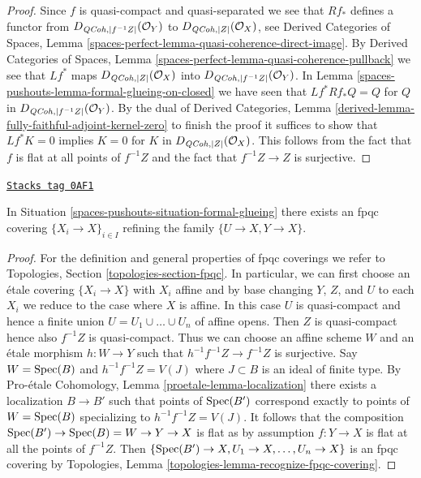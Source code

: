 \begin{proof}
Since $f$ is quasi-compact and quasi-separated we see that $Rf_*$
defines a functor from $D_{\mathit{QCoh}, |f^{-1}Z|}(\mathcal{O}_Y)$
to $D_{\mathit{QCoh}, |Z|}(\mathcal{O}_X)$, see
Derived Categories of Spaces, Lemma
\ref{spaces-perfect-lemma-quasi-coherence-direct-image}.
By Derived Categories of Spaces, Lemma
\ref{spaces-perfect-lemma-quasi-coherence-pullback}
we see that $Lf^*$ maps $D_{\mathit{QCoh}, |Z|}(\mathcal{O}_X)$
into $D_{\mathit{QCoh}, |f^{-1}Z|}(\mathcal{O}_Y)$.
In Lemma \ref{spaces-pushouts-lemma-formal-glueing-on-closed} we have seen that
$Lf^*Rf_*Q = Q$ for $Q$ in $D_{\mathit{QCoh}, |f^{-1}Z|}(\mathcal{O}_Y)$.
By the dual of Derived Categories, Lemma
\ref{derived-lemma-fully-faithful-adjoint-kernel-zero}
to finish the proof it suffices to show that $Lf^*K = 0$
implies $K = 0$ for $K$ in $D_{\mathit{QCoh}, |Z|}(\mathcal{O}_X)$.
This follows from the fact that $f$ is flat at all points of
$f^{-1}Z$ and the fact that $f^{-1}Z \to Z$ is surjective.
\end{proof}

\begin{lemma}
\label{spaces-pushouts-lemma-dominate-by-fpqc-covering}
\href{https://stacks.math.columbia.edu/tag/0AF1}{\texttt{Stacks tag 0AF1}}

In Situation \ref{spaces-pushouts-situation-formal-glueing} there exists an
fpqc covering $\{X_i \to X\}_{i \in I}$ refining the
family $\{U \to X, Y \to X\}$.
\end{lemma}

\begin{proof}
For the definition and general properties of fpqc coverings we refer to
Topologies, Section \ref{topologies-section-fpqc}. In particular, we can
first choose an \'etale covering $\{X_i \to X\}$ with $X_i$ affine and by
base changing $Y$, $Z$, and $U$ to each $X_i$ we reduce to the case where
$X$ is affine. In this case $U$ is quasi-compact and hence a finite union
$U = U_1 \cup \ldots \cup U_n$ of affine opens.
Then $Z$ is quasi-compact hence also $f^{-1}Z$ is quasi-compact.
Thus we can choose an affine scheme $W$ and an \'etale morphism
$h : W \to Y$ such that $h^{-1}f^{-1}Z \to f^{-1}Z$ is surjective.
Say $W = \operatorname{Spec}(B)$ and $h^{-1}f^{-1}Z = V(J)$ where $J \subset B$
is an ideal of finite type.
By Pro-\'etale Cohomology, Lemma \ref{proetale-lemma-localization}
there exists a localization $B \to B'$ such that points of
$\operatorname{Spec}(B')$ correspond exactly to points of $W = \operatorname{Spec}(B)$
specializing to $h^{-1}f^{-1}Z = V(J)$. It follows that the
composition $\operatorname{Spec}(B') \to \operatorname{Spec}(B) = W \to Y \to X$ is flat
as by assumption $f : Y \to X$ is flat at all the points of $f^{-1}Z$. Then
$\{\operatorname{Spec}(B') \to X, U_1 \to X, \ldots, U_n \to X\}$
is an fpqc covering by
Topologies, Lemma \ref{topologies-lemma-recognize-fpqc-covering}.
\end{proof}

